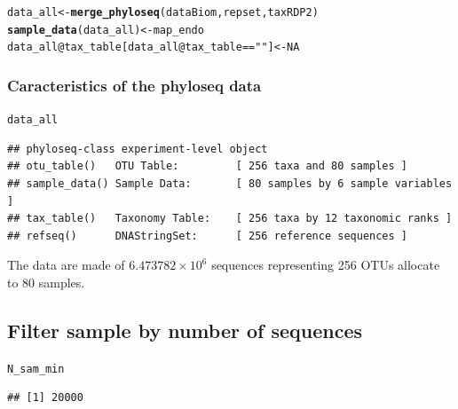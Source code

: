 \documentclass[12pt]{article}\usepackage[]{graphicx}\usepackage[]{color}
\makeatletter
\newcommand{\hlnum}[1]{\textcolor[rgb]{0.686,0.059,0.569}{#1}}%
\newcommand{\hlstr}[1]{\textcolor[rgb]{0.192,0.494,0.8}{#1}}%
\newcommand{\hlopt}[1]{\textcolor[rgb]{0,0,0}{#1}}%
\newcommand{\hlstd}[1]{\textcolor[rgb]{0.345,0.345,0.345}{#1}}%
\newcommand{\hlkwb}[1]{\textcolor[rgb]{0.69,0.353,0.396}{#1}}%
\newcommand{\hlkwc}[1]{\textcolor[rgb]{0.333,0.667,0.333}{#1}}%
\newcommand{\hlkwd}[1]{\textcolor[rgb]{0.737,0.353,0.396}{\textbf{#1}}}%
\newenvironment{kframe}{%
 \def\at@end@of@kframe{}%
 \ifinner\ifhmode%
  \def\at@end@of@kframe{\end{minipage}}%
  \begin{minipage}{\columnwidth}%
 \fi\fi%
 \def\FrameCommand##1{\hskip\@totalleftmargin \hskip-\fboxsep
 \colorbox{shadecolor}{##1}\hskip-\fboxsep
     \hskip-\linewidth \hskip-\@totalleftmargin \hskip\columnwidth}%
 \MakeFramed {\advance\hsize-\width
   \@totalleftmargin\z@ \linewidth\hsize
   \@setminipage}}%
 {\par\unskip\endMakeFramed%
 \at@end@of@kframe}
\newenvironment{knitrout}{}{} %
\numberwithin{figure}{section}
\makeatother
\begin{document}
\begin{knitrout}\small
{}\color{fgcolor}\begin{kframe}
\begin{alltt}
\hlstd{data_all} \hlkwb{<-} \hlkwd{merge_phyloseq}\hlstd{(dataBiom, repset, taxRDP2)}
\hlkwd{sample_data}\hlstd{(data_all)} \hlkwb{<-} \hlstd{map_endo}
\hlstd{data_all}\hlopt{@}\hlkwc{tax_table}\hlstd{[data_all}\hlopt{@}\hlkwc{tax_table} \hlopt{==} \hlstr{""}\hlstd{]} \hlkwb{<-} \hlnum{NA}
\end{alltt}
\end{kframe}
\end{knitrout}

\subsubsection{Caracteristics of the phyloseq data}
  
\begin{knitrout}\small
{}\color{fgcolor}\begin{kframe}
\begin{alltt}
\hlstd{data_all}
\end{alltt}
\begin{verbatim}
## phyloseq-class experiment-level object
## otu_table()   OTU Table:         [ 256 taxa and 80 samples ]
## sample_data() Sample Data:       [ 80 samples by 6 sample variables ]
## tax_table()   Taxonomy Table:    [ 256 taxa by 12 taxonomic ranks ]
## refseq()      DNAStringSet:      [ 256 reference sequences ]
\end{verbatim}
\end{kframe}
\end{knitrout}

The data are made of \ensuremath{6.473782\times 10^{6}} sequences representing 256 OTUs allocate to 80 samples.

  \subsection{Filter sample by number of sequences}

\begin{knitrout}\small
{}\color{fgcolor}\begin{kframe}
\begin{alltt}
\hlstd{N_sam_min}
\end{alltt}
\begin{verbatim}
## [1] 20000
\end{verbatim}
\end{kframe}
\end{knitrout}
\end{document}
